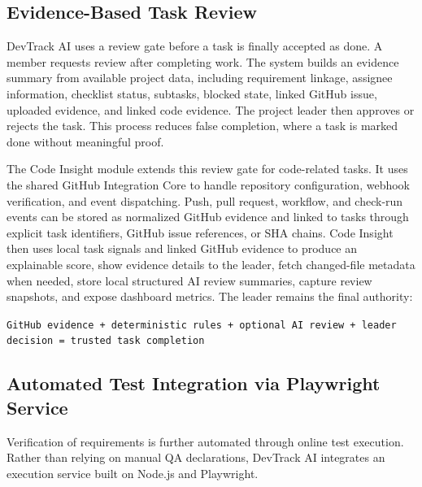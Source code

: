 \subsection{Evidence-Based Task Review}

DevTrack AI uses a review gate before a task is finally accepted as done. A member
requests review after completing work. The system builds an evidence summary from
available project data, including requirement linkage, assignee information,
checklist status, subtasks, blocked state, linked GitHub issue, uploaded evidence,
and linked code evidence. The project leader then approves or rejects the task. This
process reduces false completion, where a task is marked done without meaningful
proof.

The Code Insight module extends this review gate for code-related tasks. It uses the
shared GitHub Integration Core to handle repository configuration, webhook
verification, and event dispatching. Push, pull request, workflow, and check-run
events can be stored as normalized GitHub evidence and linked to tasks through
explicit task identifiers, GitHub issue references, or SHA chains. Code Insight then
uses local task signals and linked GitHub evidence to produce an explainable score,
show evidence details to the leader, fetch changed-file metadata when needed, store
local structured AI review summaries, capture review snapshots, and expose dashboard
metrics. The leader remains the final authority:

\begin{center}
\texttt{GitHub evidence + deterministic rules + optional AI review + leader decision = trusted task completion}
\end{center}

\subsection{Automated Test Integration via Playwright Service}

Verification of requirements is further automated through online test execution. Rather than relying on manual QA declarations, DevTrack AI integrates an execution service built on Node.js and Playwright. 

